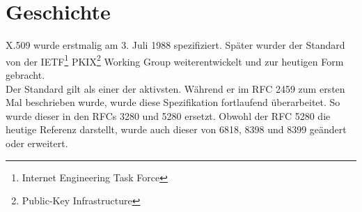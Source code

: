 \chapter{Geschichte}
X.509 wurde erstmalig am 3. Juli 1988 spezifiziert. Später wurder der Standard von der IETF\footnote{Internet Engineering Task Force} PKIX\footnote{Public-Key Infrastructure} Working Group 
weiterentwickelt und zur heutigen Form gebracht.\\
Der Standard gilt als einer der aktivsten. Während er im RFC 2459 zum ersten Mal beschrieben wurde, wurde diese Spezifikation fortlaufend überarbeitet.
So wurde dieser in den RFCs 3280 und 5280 ersetzt. Obwohl der RFC 5280 die heutige Referenz darstellt, wurde auch dieser von 6818, 8398 und 8399 geändert oder erweitert.
    
